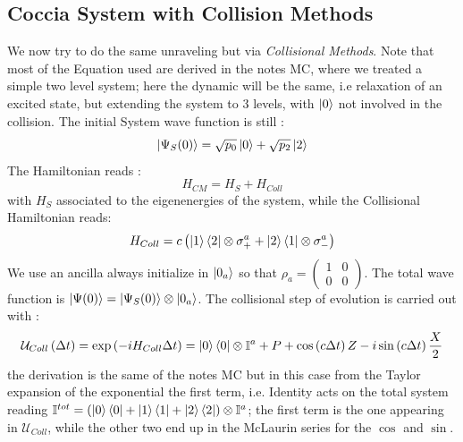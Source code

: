 \documentclass[a4paper,12pt]{article}
\begin{document}
\subsection{Coccia System with Collision Methods}
\label{sub:Coccia_system_with_CM}
We now try to do the same unraveling but via \textit{Collisional Methods}. Note that most of the Equation used are derived in the notes MC, where we treated a simple two level system; here the dynamic will be the same, i.e relaxation of an excited state, but extending the system to 3 levels, with $ \ket{0} $ not involved in the collision.
The initial System wave function is still : 
\begin{equation}
	\ket{\Psi_{S} (0)} = \sqrt{p_{0}} \ket{0} + \sqrt{p_{2}} \ket{2}
\end{equation}
The Hamiltonian reads : 
\begin{equation}
	H_{CM} = H_{S} + H_{Coll}
\end{equation}
with $ H_{S} $ associated to the eigenenergies of the system, while the Collisional Hamiltonian reads:
\begin{equation}
	H_{Coll} = c \left( \ket{1}\bra{2} \otimes \sigma_{+}^{a} + \ket{2}\bra{1} \otimes \sigma_{-}^{a} \right)
	\label{eq:H_coll_3_level_system}
\end{equation}
We use an ancilla always initialize in $ \ket{0_{a}} $ so that $ \rho_{a} = \begin{pmatrix} 1 & 0 \\ 0 & 0 \end{pmatrix} $. \newline
The total wave function is $ \ket{\Psi (0)} = \ket{\Psi_{S} (0)} \otimes \ket{0_{a}} $. \newline
The collisional step of evolution is carried out with :
\begin{equation}
	\mathcal{U}_{Coll} \left( \Delta t \right) = \exp \left( -i H_{Coll} \Delta t \right) = \ket{0}\bra{0} \otimes \mathbb{I}^{a} + P + \cos \left( c \Delta t \right) Z - i \sin \left( c \Delta t \right) \frac{X}{2} 
\end{equation} 
the derivation is the same of the notes MC but in this case from the Taylor expansion of the exponential the first term, i.e. Identity acts on the total system reading $ \mathbb{I}^{tot} = \left(\ket{0}\bra{0} + \ket{1}\bra{1} + \ket{2}\bra{2}\right) \otimes \mathbb{I}^{a} $; the first term is the one appearing in $ \mathcal{U}_{Coll} $, while the other two end up in the McLaurin series for the $ \cos $ and $ \sin $. \newline
\end{document}
